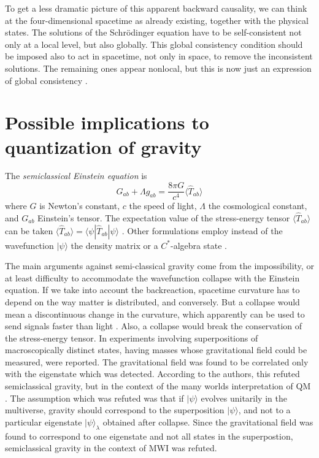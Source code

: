 \documentclass[11pt]{amsart}
\theoremstyle{definition}
\theoremstyle{plain}
\begin{document}
To get a less dramatic picture of this apparent backward causality, we can think at the four-dimensional spacetime as already existing, together with the physical states. The solutions of the Schr\"odinger equation have to be self-consistent not only at a local level, but also globally. This global consistency condition should be imposed also to act in spacetime, not only in space, to remove the inconsistent solutions. The remaining ones appear nonlocal, but this is now just an expression of global consistency \cite{Sto12QMc,Sto13bSpringer}.


\section{Possible implications to quantization of gravity}
\label{s:quantum_gravity}

The \emph{semiclassical Einstein equation} is
\begin{equation}
\label{eq:einstein_semiclassical}
G_{ab} + \Lambda g_{ab} = \frac{8\pi G}{c^4} \langle \hat T_{ab} \rangle
\end{equation}
where $G$ is Newton's constant, $c$ the speed of light, $\Lambda$ the cosmological constant, and $G_{ab}$ Einstein's tensor. The expectation value of the stress-energy tensor $\langle \hat T_{ab} \rangle$ can be taken $\langle \hat T_{ab} \rangle=\langle{\psi}|\hat T_{ab}|{\psi}\rangle$ \cite{Moller1962EnergyMomentumQuantum,Rosenfeld1963QuantizationFields}. Other formulations employ instead of the wavefunction $|{\psi}\rangle$ the density matrix or a $C^\ast$-algebra state \cite{Wal94}.


The main arguments against semi-classical gravity come from the impossibility, or at least difficulty to accommodate the wavefunction collapse with the Einstein equation. If we take into account the backreaction, spacetime curvature has to depend on the way matter is distributed, and conversely. But a collapse would mean a discontinuous change in the curvature, which apparently can be used to send signals faster than light \cite{EppleyHannah1977NecessityQuantizeGravitationalField}. Also, a collapse would break the conservation of the stress-energy tensor. In \cite{PageGeilker1981IndirectEvidenceQM} experiments involving superpositions of macroscopically distinct states, having masses whose gravitational field could be measured, were reported. The gravitational field was found to be correlated only with the eigenstate which was detected. According to the authors, this refuted semiclassical gravity, but in the context of the many worlds interpretation of QM \cite{Eve57,Eve73}. The assumption which was refuted was that if $|{\psi}\rangle$ evolves unitarily in the multiverse, gravity should correspond to the superposition $|{\psi}\rangle$, and not to a particular eigenstate $|{\psi}\rangle_\lambda$ obtained after collapse. Since the gravitational field was found to correspond to one eigenstate and not all states in the superpostion, semiclassical gravity in the context of MWI was refuted.
\end{document}
